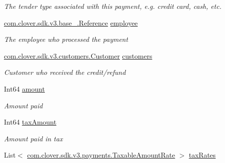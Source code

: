 \begin{DoxyCompactItemize}
\begin{DoxyCompactList}\small\item\em The tender type associated with this payment, e.\+g. credit card, cash, etc. \end{DoxyCompactList}\item 
\hyperlink{classcom_1_1clover_1_1sdk_1_1v3_1_1base___1_1_reference}{com.\+clover.\+sdk.\+v3.\+base\+\_\+.\+Reference} \hyperlink{classcom_1_1clover_1_1sdk_1_1v3_1_1payments_1_1_credit_aafae65ef4b8afa39c532c844c4ad5470}{employee}
\begin{DoxyCompactList}\small\item\em The employee who processed the payment \end{DoxyCompactList}\item 
\hyperlink{classcom_1_1clover_1_1sdk_1_1v3_1_1customers_1_1_customer}{com.\+clover.\+sdk.\+v3.\+customers.\+Customer} \hyperlink{classcom_1_1clover_1_1sdk_1_1v3_1_1payments_1_1_credit_a1d075194acd4bc2987fad6757dd31520}{customers}
\begin{DoxyCompactList}\small\item\em Customer who received the credit/refund \end{DoxyCompactList}\item 
Int64 \hyperlink{classcom_1_1clover_1_1sdk_1_1v3_1_1payments_1_1_credit_ab99189a5b7662b47323aca6862b99c0c}{amount}
\begin{DoxyCompactList}\small\item\em Amount paid \end{DoxyCompactList}\item 
Int64 \hyperlink{classcom_1_1clover_1_1sdk_1_1v3_1_1payments_1_1_credit_a90650469195d49f730284b3e5e0fc3dd}{tax\+Amount}
\begin{DoxyCompactList}\small\item\em Amount paid in tax \end{DoxyCompactList}\item 
List$<$ \hyperlink{classcom_1_1clover_1_1sdk_1_1v3_1_1payments_1_1_taxable_amount_rate}{com.\+clover.\+sdk.\+v3.\+payments.\+Taxable\+Amount\+Rate} $>$ \hyperlink{classcom_1_1clover_1_1sdk_1_1v3_1_1payments_1_1_credit_ab1b45423634a78d0ecc19e7b1c93a608}{tax\+Rates}

\end{DoxyCompactItemize}
